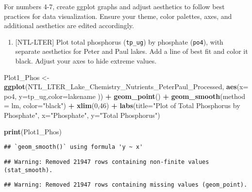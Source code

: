 \documentclass[
]{article}
\newenvironment{Shaded}{\begin{snugshade}}{\end{snugshade}}
\newcommand{\DataTypeTok}[1]{\textcolor[rgb]{0.13,0.29,0.53}{#1}}
\newcommand{\DecValTok}[1]{\textcolor[rgb]{0.00,0.00,0.81}{#1}}
\newcommand{\KeywordTok}[1]{\textcolor[rgb]{0.13,0.29,0.53}{\textbf{#1}}}
\newcommand{\NormalTok}[1]{#1}
\newcommand{\OperatorTok}[1]{\textcolor[rgb]{0.81,0.36,0.00}{\textbf{#1}}}
\newcommand{\StringTok}[1]{\textcolor[rgb]{0.31,0.60,0.02}{#1}}
\providecommand{\tightlist}{%
  \setlength{\itemsep}{0pt}\setlength{\parskip}{0pt}}
\begin{document}
For numbers 4-7, create ggplot graphs and adjust aesthetics to follow
best practices for data visualization. Ensure your theme, color
palettes, axes, and additional aesthetics are edited accordingly.

\begin{enumerate}
\def\labelenumi{\arabic{enumi}.}
\setcounter{enumi}{3}
\tightlist
\item
  {[}NTL-LTER{]} Plot total phosphorus (\texttt{tp\_ug}) by phosphate
  (\texttt{po4}), with separate aesthetics for Peter and Paul lakes. Add
  a line of best fit and color it black. Adjust your axes to hide
  extreme values.
\end{enumerate}

\begin{Shaded}
\begin{Highlighting}[]
\NormalTok{Plot1_Phos <-}\StringTok{ }\KeywordTok{ggplot}\NormalTok{(NTL_LTER_Lake_Chemistry_Nutrients_PeterPaul_Processed,}
                     \KeywordTok{aes}\NormalTok{(}\DataTypeTok{x=}\NormalTok{ po4, }\DataTypeTok{y=}\NormalTok{tp_ug,}\DataTypeTok{color=}\NormalTok{lakename )) }\OperatorTok{+}
\StringTok{  }\KeywordTok{geom_point}\NormalTok{() }\OperatorTok{+}
\StringTok{  }\KeywordTok{geom_smooth}\NormalTok{(}\DataTypeTok{method =}\NormalTok{ lm, }\DataTypeTok{color=}\StringTok{"black"}\NormalTok{) }\OperatorTok{+}
\StringTok{  }\KeywordTok{xlim}\NormalTok{(}\DecValTok{0}\NormalTok{,}\DecValTok{46}\NormalTok{) }\OperatorTok{+}
\StringTok{  }\KeywordTok{labs}\NormalTok{(}\DataTypeTok{title=}\StringTok{"Plot of Total Phosphorus by Phosphate"}\NormalTok{,}
  \DataTypeTok{x=}\StringTok{"Phosphate"}\NormalTok{,}
  \DataTypeTok{y=}\StringTok{"Total Phosphorus"}\NormalTok{)}
  

\KeywordTok{print}\NormalTok{(Plot1_Phos) }
\end{Highlighting}
\end{Shaded}

\begin{verbatim}
## `geom_smooth()` using formula 'y ~ x'
\end{verbatim}

\begin{verbatim}
## Warning: Removed 21947 rows containing non-finite values (stat_smooth).
\end{verbatim}

\begin{verbatim}
## Warning: Removed 21947 rows containing missing values (geom_point).
\end{verbatim}
\end{document}
